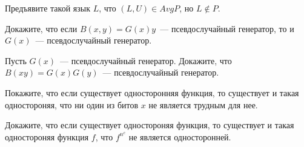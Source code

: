 \setcounter{curtask}{1}

\mytitle{}

\begin{task}
    Предъявите такой язык $L$, что $(L, U) \in AvgP$, но $L \notin P$.
\end{task}

\begin{task}
    Докажите, что если $B(x, y) = G(x)y$~--- псевдослучайный генератор, то и
    $G(x)$~--- псевдослучайный генератор.
\end{task}

\breakline

\begin{task}
    Пусть $G(x)$~--- псевдослучайный генератор. Докажите, что $B(xy) = G(x)G(y)$~---
    псевдослучайный генератор.
\end{task}

\begin{task}
    Покажите, что если существует односторонняя функция, то существует и такая
    одностороняя, что ни один из битов $x$ не является трудным для нее.
\end{task}

\begin{task}
    Докажите, что если существует одностороняя функция, то существует и такая
    одностороняя функция $f$, что $f^{n^c}$ не является односторонней.
\end{task}